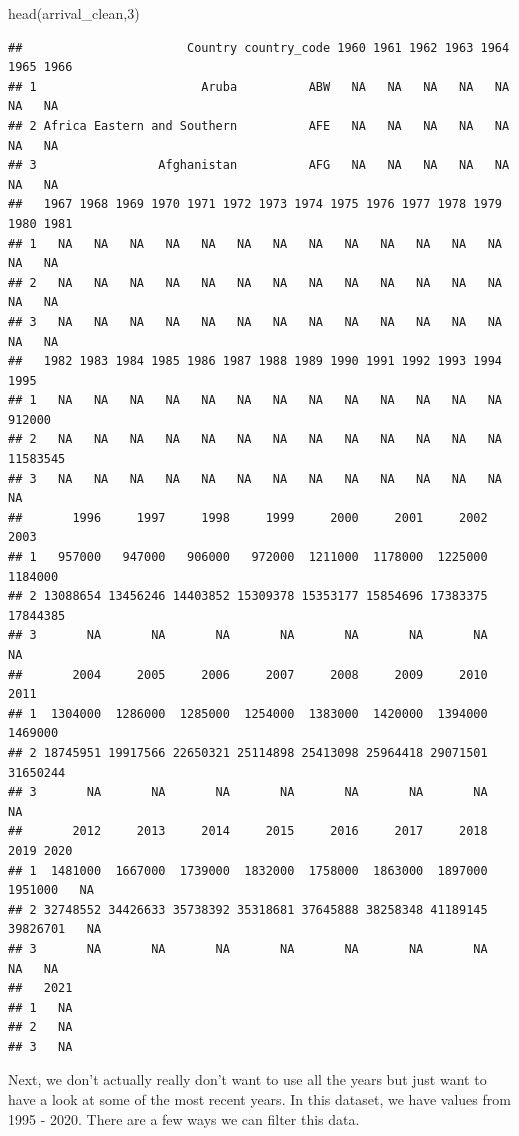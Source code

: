 \documentclass[
]{book}
\newenvironment{Shaded}{\begin{snugshade}}{\end{snugshade}}
\newcommand{\DecValTok}[1]{\textcolor[rgb]{0.00,0.00,0.81}{#1}}
\newcommand{\FunctionTok}[1]{\textcolor[rgb]{0.00,0.00,0.00}{#1}}
\newcommand{\NormalTok}[1]{#1}
\begin{document}
\begin{Shaded}
\begin{Highlighting}[]
\FunctionTok{head}\NormalTok{(arrival\_clean,}\DecValTok{3}\NormalTok{)}
\end{Highlighting}
\end{Shaded}

\begin{verbatim}
##                       Country country_code 1960 1961 1962 1963 1964 1965 1966
## 1                       Aruba          ABW   NA   NA   NA   NA   NA   NA   NA
## 2 Africa Eastern and Southern          AFE   NA   NA   NA   NA   NA   NA   NA
## 3                 Afghanistan          AFG   NA   NA   NA   NA   NA   NA   NA
##   1967 1968 1969 1970 1971 1972 1973 1974 1975 1976 1977 1978 1979 1980 1981
## 1   NA   NA   NA   NA   NA   NA   NA   NA   NA   NA   NA   NA   NA   NA   NA
## 2   NA   NA   NA   NA   NA   NA   NA   NA   NA   NA   NA   NA   NA   NA   NA
## 3   NA   NA   NA   NA   NA   NA   NA   NA   NA   NA   NA   NA   NA   NA   NA
##   1982 1983 1984 1985 1986 1987 1988 1989 1990 1991 1992 1993 1994     1995
## 1   NA   NA   NA   NA   NA   NA   NA   NA   NA   NA   NA   NA   NA   912000
## 2   NA   NA   NA   NA   NA   NA   NA   NA   NA   NA   NA   NA   NA 11583545
## 3   NA   NA   NA   NA   NA   NA   NA   NA   NA   NA   NA   NA   NA       NA
##       1996     1997     1998     1999     2000     2001     2002     2003
## 1   957000   947000   906000   972000  1211000  1178000  1225000  1184000
## 2 13088654 13456246 14403852 15309378 15353177 15854696 17383375 17844385
## 3       NA       NA       NA       NA       NA       NA       NA       NA
##       2004     2005     2006     2007     2008     2009     2010     2011
## 1  1304000  1286000  1285000  1254000  1383000  1420000  1394000  1469000
## 2 18745951 19917566 22650321 25114898 25413098 25964418 29071501 31650244
## 3       NA       NA       NA       NA       NA       NA       NA       NA
##       2012     2013     2014     2015     2016     2017     2018     2019 2020
## 1  1481000  1667000  1739000  1832000  1758000  1863000  1897000  1951000   NA
## 2 32748552 34426633 35738392 35318681 37645888 38258348 41189145 39826701   NA
## 3       NA       NA       NA       NA       NA       NA       NA       NA   NA
##   2021
## 1   NA
## 2   NA
## 3   NA
\end{verbatim}

Next, we don't actually really don't want to use all the years but just want to have a look at some of the most recent years. In this dataset, we have values from 1995 - 2020. There are a few ways we can filter this data.
\end{document}
